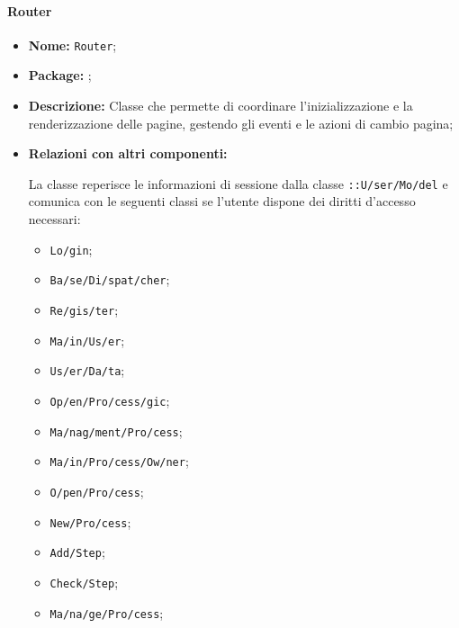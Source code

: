 \paragraph{Router}
\begin{flushleft}
\begin{itemize}
\item \textbf{Nome:} \texttt{Router};
\item \textbf{Package:} \texttt{\logic{}};
\item \textbf{Descrizione:} Classe che permette di coordinare l'inizializzazione e la renderizzazione delle pagine, gestendo gli eventi e le azioni di cambio pagina;
\item \textbf{Relazioni con altri componenti:}
\begin{sloppypar}
La classe reperisce le informazioni di sessione dalla classe \texttt{\model{}::U\fshyp{}ser\fshyp{}Mo\fshyp{}del} e comunica con le seguenti classi se l'utente dispone dei diritti d'accesso necessari:
\begin{itemize}
\item \texttt{\logic{}Lo\fshyp{}gin};
\item \texttt{\logic{}Ba\fshyp{}se\fshyp{}Di\fshyp{}spat\fshyp{}cher};
\item \texttt{\logicUser{}Re\fshyp{}gis\fshyp{}ter};
\item \texttt{\logicUser{}Ma\fshyp{}in\fshyp{}Us\fshyp{}er};
\item \texttt{\logicUser{}Us\fshyp{}er\fshyp{}Da\fshyp{}ta};
\item \texttt{\logicUser{}Op\fshyp{}en\fshyp{}Pro\fshyp{}cess\fshyp{}gic};
\item \texttt{\logicUser{}Ma\fshyp{}nag\fshyp{}ment\fshyp{}Pro\fshyp{}cess};
\item \texttt{\logicAdmin{}Ma\fshyp{}in\fshyp{}Pro\fshyp{}cess\fshyp{}Ow\fshyp{}ner};
\item \texttt{\logicAdmin{}O\fshyp{}pen\fshyp{}Pro\fshyp{}cess};
\item \texttt{\logicAdmin{}New\fshyp{}Pro\fshyp{}cess};
\item \texttt{\logicAdmin{}Add\fshyp{}Step};
\item \texttt{\logicAdmin{}Check\fshyp{}Step};
\item \texttt{\logicAdmin{}Ma\fshyp{}na\fshyp{}ge\fshyp{}Pro\fshyp{}cess};
\end{itemize}
\end{sloppypar}
\end{itemize}
\end{flushleft}

